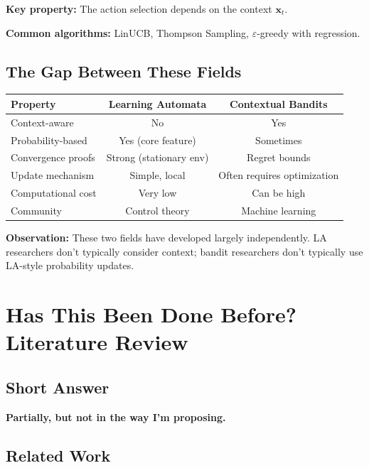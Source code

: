 \documentclass[11pt]{article}
\begin{document}
\textbf{Key property:} The action selection depends on the context $\mathbf{x}_t$.

\textbf{Common algorithms:} LinUCB, Thompson Sampling, $\varepsilon$-greedy with regression.

\subsection{The Gap Between These Fields}

\begin{center}
\begin{tabular}{lcc}
\toprule
\textbf{Property} & \textbf{Learning Automata} & \textbf{Contextual Bandits} \\
\midrule
Context-aware & No & Yes \\
Probability-based & Yes (core feature) & Sometimes \\
Convergence proofs & Strong (stationary env) & Regret bounds \\
Update mechanism & Simple, local & Often requires optimization \\
Computational cost & Very low & Can be high \\
Community & Control theory & Machine learning \\
\bottomrule
\end{tabular}
\end{center}

\textbf{Observation:} These two fields have developed largely independently. LA researchers don't typically consider context; bandit researchers don't typically use LA-style probability updates.

\section{Has This Been Done Before? Literature Review}

\subsection{Short Answer}

\textbf{Partially, but not in the way I'm proposing.}

\subsection{Related Work}
\end{document}
